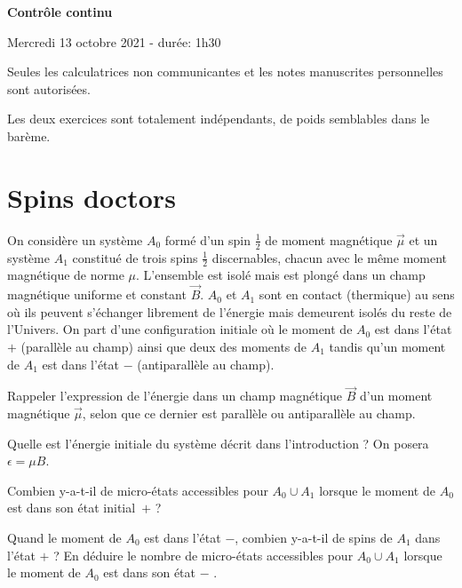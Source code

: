 \documentclass[utf8, 11pt]{feuille}
\begin{document}
\begin{center}
    \Large {\bf Contrôle continu}
    
    Mercredi 13 octobre 2021 - durée: 1h30
\end{center}

Seules les calculatrices non communicantes et les notes manuscrites personnelles sont autorisées.

Les deux exercices sont totalement indépendants, de poids semblables dans le barème.

%





\section{Spins doctors}

On considère un système $A_0$ formé d'un spin $\frac{1}{2}$ de moment magnétique $\Vec{\mu}$ et un système $A_1$ constitué de trois spins $\frac{1}{2}$ discernables, chacun avec le même moment magnétique de norme $\mu$. L'ensemble est isolé mais est plongé dans un champ magnétique uniforme et constant $\vec B$. $A_0$ et $A_1$ sont en contact (thermique) au sens où ils peuvent s'échanger librement de l'énergie mais demeurent isolés du reste de l'Univers. On part d'une configuration initiale où le moment de $A_0$ est dans l'état $+$ (parallèle au champ) ainsi que  deux des moments
de $A_1$ tandis qu'un moment de $A_1$ est dans l'état $-$ (antiparallèle au champ).

\medskip

\question Rappeler l'expression de l'énergie dans un champ magnétique $\vec B$ d'un moment magnétique $\Vec{\mu}$,  selon que ce dernier est parallèle ou antiparallèle au champ.

\question Quelle est l'énergie initiale du système décrit dans l'introduction ? On posera $\epsilon=\mu B$.

\question Combien y-a-t-il de micro-états accessibles pour $A_0 \cup A_1$ lorsque le moment de $A_0$ est dans son état \mbox{initial $+$} ? 

\question Quand le moment de $A_0$ est dans l'état $-$, combien y-a-t-il de spins de $A_1$ dans l'état $+$ ? En déduire le nombre de micro-états accessibles pour $A_0 \cup A_1$ lorsque le moment de $A_0$ est dans son état $-$ .
\end{document}
